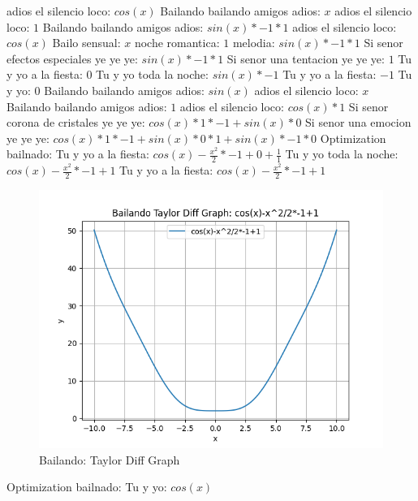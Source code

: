 \documentclass{article}
\begin{document}
adios el silencio loco: $cos(x)$  \newline Bailando bailando amigos adios: $x$ adios el silencio loco: $1$  \newline Bailando bailando amigos adios: $sin(x)*-1*1$ adios el silencio loco: $cos(x)$  \newline Bailo sensual: $x$ noche romantica: $1$  \newline melodia: $sin(x)*-1*1$ Si senor efectos especiales ye ye ye: $sin(x)*-1*1$ Si senor una tentacion ye ye ye: $1$ Tu y yo a la fiesta: $0$  \newline Tu y yo toda la noche: $sin(x)*-1$ Tu y yo a la fiesta: $-1$ Tu y yo: $0$  \newline Bailando bailando amigos adios: $sin(x)$  \newline adios el silencio loco: $x$ Bailando bailando amigos adios: $1$  \newline adios el silencio loco: $cos(x)*1$ Si senor corona de cristales ye ye ye: $cos(x)*1*-1+sin(x)*0$ Si senor una emocion ye ye ye: ${cos(x)*1*-1+sin(x)*0}*1+sin(x)*-1*0$  \newline \newline Optimization bailnado: \newline Tu y yo a la fiesta: $cos(x)-\frac{x^2}{2}*-1+0+\frac{1}{1}$  \newline Tu y yo toda la noche: $cos(x)-\frac{x^2}{2}*-1+1$  \newline Tu y yo a la fiesta: $cos(x)-\frac{x^2}{2}*-1+1$  \newline \begin{figure}
\centering
\includegraphics[width=0.8\linewidth]{Bailando Taylor Diff Graph.png}
\caption{Bailando: Taylor Diff Graph}
\label{fig:my_image}
\end{figure}
 \newline \newline Optimization bailnado: \newline Tu y yo: $cos(x)$  \newline 
\end{document}
